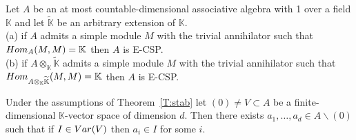 \documentclass[10pt,a4paper]{amsart}
\begin{document}
\begin{theorem}\label{T:stab} Let $A$ be an at most countable-dimensional associative algebra with 1 over a field $\mathbb K$ and let $\widetilde{\mathbb K}$ be an arbitrary extension of $\mathbb K$. \\
(a) if $A$ admits a simple module $M$ with the trivial annihilator such that ${\rm Hom}_{A}(M, M)=\mathbb K$ then $A$ is E-CSP.\\
(b) if $A\otimes_{\mathbb K}{\widetilde{\mathbb K}}$ admits a simple module $M$ with the trivial annihilator such that  ${\rm Hom}_{A\otimes_{\mathbb K}{\widetilde{\mathbb K}}}(M, M)=\mathbb K$ then $A$ is E-CSP.
\end{theorem}

\begin{lemma}\label{L:stab} Under the assumptions of Theorem~\ref{T:stab} let $(0)\ne V\subset A$ be a finite-dimensional $\mathbb K$-vector space of dimension $d$. 
Then there exists $a_1, \ldots, a_d\in A\backslash(0)$ such that if $I\in{\rm Var}(V)$ then $a_i\in I$ for some $i$.\end{lemma}
\end{document}
